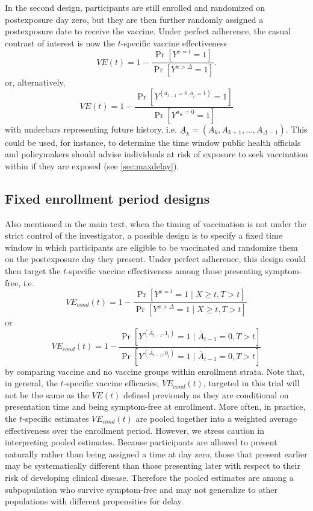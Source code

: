 \begin{appendices}
\begin{refsection}
    In the second design, participants are still enrolled and randomized on postexposure day zero, but they are then further randomly assigned a postexposure date to receive the vaccine.  Under perfect adherence, the casual contrast of interest is now the $t$-specific vaccine effectiveness
    $$VE(t) = 1 - \frac{\Pr[Y^{x = t} = 1]}{\Pr[Y^{x > \Delta} = 1]}.$$
    or, alternatively,
    $$VE(t) = 1 - \dfrac{\Pr[Y^{(\overline{a}_{t-1}=0, \underline{a}_{t} = 1)} = 1]}{\Pr[Y^{\overline{a}_{K} = 0} = 1]}$$
    with underbars representing future history, i.e. $\underline{A}_k = (A_k, A_{k+1}, \ldots, A_{\Delta - 1})$. This could be used, for instance, to determine the time window public health officials and policymakers should advise individuals at risk of exposure to seek vaccination within if they are exposed (see \ref{sec:maxdelay}).
    \clearpage
    \subsection{Fixed enrollment period designs} \label{sec:enrollment}

    Also mentioned in the main text, when the timing of vaccination is not under the strict control of the investigator, a possible design is to specify a fixed time window in which participants are eligible to be vaccinated and randomize them on the postexposure day they present. Under perfect adherence, this design could then target the $t$-specific vaccine effectiveness among those presenting symptom-free, i.e.
    $$
    VE_{cond}(t) = 1 - \frac{\Pr[Y^{x = t} = 1 \mid X \geq t, T > t]}{\Pr[Y^{x > \Delta} = 1 \mid X \geq t, T > t]}
    $$
    or 
    $$VE_{cond}(t) = 1 - \dfrac{\Pr[Y^{(\overline{A}_{t-1}, \underline{1}_{t})} = 1\mid \overline{A}_{t-1} = 0, T > t]}{\Pr[Y^{(\overline{A}_{t-1}, \underline{0}_{t})} = 1\mid \overline{A}_{t-1} = 0, T > t]}$$
    by comparing vaccine and no vaccine groups within enrollment strata. Note that, in general, the $t$-specific vaccine efficacies, $VE_{cond}(t)$, targeted in this trial will not be the same as the $VE(t)$ defined previously as they are conditional on presentation time and being symptom-free at enrollment. More often, in practice, the $t$-specific estimates $VE_{cond}(t)$ are pooled together into a weighted average effectiveness over the enrollment period. However, we stress caution in interpreting pooled estimates. Because participants are allowed to present naturally rather than being assigned a time at day zero, those that present earlier may be systematically different than those presenting later with respect to their risk of developing clinical disease. Therefore the pooled estimates are among a subpopulation who survive symptom-free and may not generalize to other populations with different propensities for delay. 
    \clearpage 

\end{refsection}
\end{appendices}
